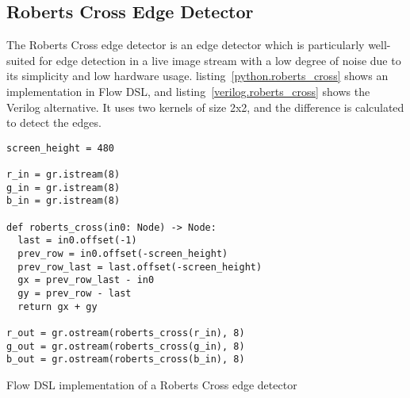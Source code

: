 \subsection{Roberts Cross Edge Detector}
The Roberts Cross edge detector is an edge detector which is particularly well-suited for edge detection in a live image stream with a low degree of noise due to its simplicity and low hardware usage. listing \ref{python.roberts_cross} shows an implementation in Flow DSL, and listing \ref{verilog.roberts_cross} shows the Verilog alternative. It uses two kernels of size 2x2, and the difference is calculated to detect the edges.

\begin{listing}[H]
  \begin{verbatim}
screen_height = 480

r_in = gr.istream(8)
g_in = gr.istream(8)
b_in = gr.istream(8)

def roberts_cross(in0: Node) -> Node:
  last = in0.offset(-1)
  prev_row = in0.offset(-screen_height)
  prev_row_last = last.offset(-screen_height)
  gx = prev_row_last - in0
  gy = prev_row - last
  return gx + gy

r_out = gr.ostream(roberts_cross(r_in), 8)
g_out = gr.ostream(roberts_cross(g_in), 8)
b_out = gr.ostream(roberts_cross(b_in), 8)
  \end{verbatim}
  \caption{Flow DSL implementation of a Roberts Cross edge detector}\label{python.roberts_cross}
\end{listing}

